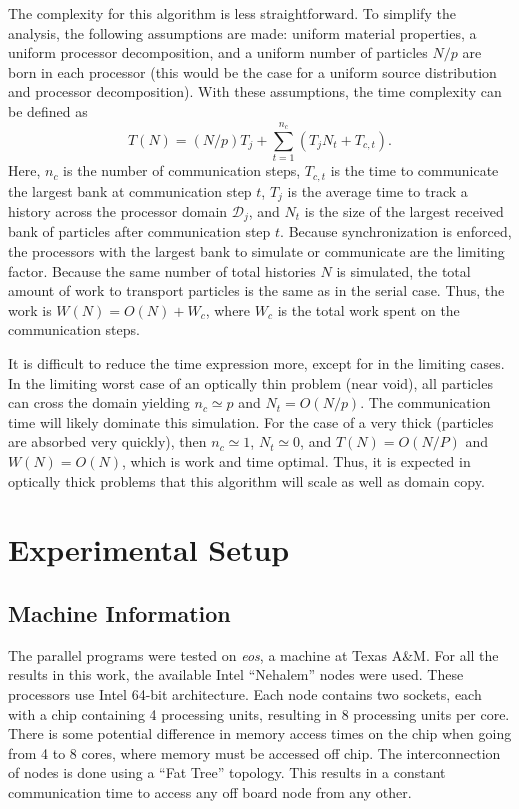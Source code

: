 \documentclass[12pt]{article}
\newcommand{\DD}{\mathcal{D}}
\begin{document}
{{The complexity for this algorithm is less straightforward. To simplify the analysis,
the following assumptions are made: uniform material properties, a uniform processor
decomposition, and a uniform number of
particles $N/p$ are born in each processor (this would be the case for a uniform
source distribution and processor decomposition).  With these assumptions, the time complexity can
be defined as
\begin{equation}
    T(N) = (N/p)T_j+ \sum_{t=1}^{n_c}\left(T_jN_t +  T_{c,t}\right).
\end{equation}
Here, $n_c$ is the number of
communication steps, $T_{c,t}$ is the time to communicate the largest bank at
communication step
$t$, $T_j$ is the average time to track a history across the processor domain
$\DD_j$, and $N_t$ is the size of the largest received bank of particles after communication step $t$.
Because synchronization is enforced, the processors with the largest bank to
simulate or communicate are the limiting factor. Because the same number of total
histories $N$ is simulated, the total amount of work to transport particles is the
same as in the serial case.  Thus, the work is $W(N) = O(N) +W_c$, where $W_c$ is the
total work spent on the communication steps. 

It is difficult to reduce the time expression more, except for in the limiting cases.
In the limiting worst case of an optically thin
problem (near void), all particles can cross the domain yielding $n_c \simeq p$
and $N_t=O(N/p)$. The communication time will likely dominate this simulation.  For
the case of a very thick (particles are absorbed very quickly),  then $n_c\simeq1$, $N_t\simeq0$,
and $T(N) = O(N/P)$ and $W(N) = O(N)$, which is work and time optimal.  Thus, it is expected in optically thick problems that this
algorithm will scale as well as domain copy.

\section{Experimental Setup}

\subsection{Machine Information}

The parallel programs were tested on \emph{eos}, a machine at Texas A\&M. For all the
results in this work, the available Intel ``Nehalem'' nodes were used. These
processors use Intel 64-bit architecture.  Each node contains two sockets, each with
a chip containing 4 processing units, resulting in 8 processing units per core.  There is some potential difference in
memory access times on the chip when going from 4 to 8 cores, where memory must be
accessed off chip.  The interconnection of nodes is done using a ``Fat Tree'' topology.  This
results in a constant communication time to access any off board node from any other.

}}
\end{document}
